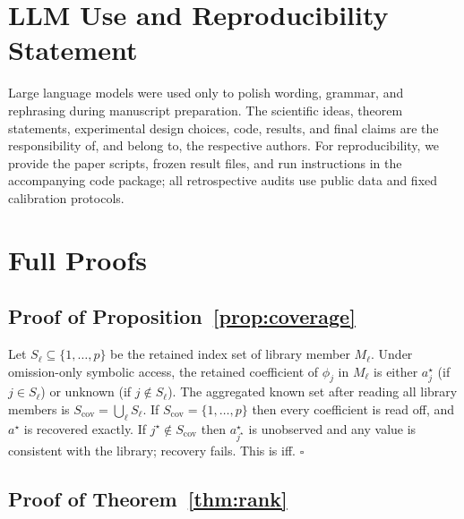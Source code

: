 \documentclass{article}
\theoremstyle{plain}
\theoremstyle{definition}
\theoremstyle{remark}
\begin{document}



\newpage
\appendix
\onecolumn

\section{LLM Use and Reproducibility Statement}
\label{app:llm-repro}

Large language models were used only to polish wording, grammar, and
rephrasing during manuscript preparation. The scientific ideas, theorem
statements, experimental design choices, code, results, and final claims are
the responsibility of, and belong to, the respective authors. For reproducibility, we provide the
paper scripts, frozen result files, and run instructions in the accompanying
code package; all retrospective audits use public data and fixed calibration
protocols.

\section{Full Proofs}
\label{app:proofs}

\subsection{Proof of Proposition~\ref{prop:coverage}}

Let $S_\ell\subseteq\{1,\ldots,p\}$ be the retained index set of library
member $M_\ell$. Under omission-only symbolic access, the retained
coefficient of $\phi_j$ in $M_\ell$ is either $a^{\star}_j$ (if $j\in S_\ell$)
or unknown (if $j\notin S_\ell$). The aggregated known set after reading all
library members is $S_{\mathrm{cov}}=\bigcup_\ell S_\ell$. If
$S_{\mathrm{cov}}=\{1,\ldots,p\}$ then every coefficient is read off, and
$a^{\star}$ is recovered exactly. If $j^\star\notin S_{\mathrm{cov}}$ then
$a^{\star}_{j^\star}$ is unobserved and any value is consistent with the
library; recovery fails. This is iff. \hfill$\square$

\subsection{Proof of Theorem~\ref{thm:rank}}
\end{document}

